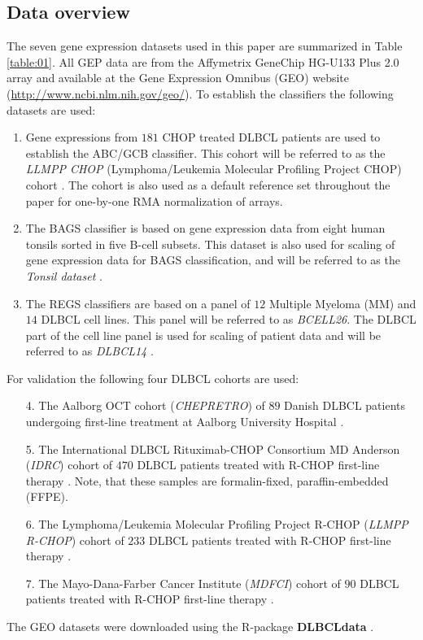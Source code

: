 \documentclass[10pt,letterpaper]{article}
\newcommand{\R}{\textsf{R}}
\newcommand{\pkg}[1]{\textbf{#1}}
\begin{document}
\subsection*{Data overview}
The seven gene expression datasets used in this paper are summarized in Table \ref{table:01}.
All GEP data are from the Affymetrix GeneChip HG-U133 Plus 2.0 array and available at the Gene Expression Omnibus (GEO) \cite{Barrett2013} website (\url{http://www.ncbi.nlm.nih.gov/geo/}).
To establish the classifiers the following datasets are used:
\begin{enumerate}
	\item Gene expressions from $181$ CHOP treated DLBCL patients are used to establish the ABC/GCB classifier.
	This cohort will be referred to as the \emph{LLMPP CHOP} (Lymphoma/Leukemia Molecular Profiling Project CHOP) cohort \cite{Lenz2008a}.
	The cohort is also used as a default reference set throughout the paper for one-by-one RMA normalization of arrays.
	\item The BAGS classifier is based on gene expression data from eight human tonsils sorted in five B-cell subsets.
	This dataset is also used for scaling of gene expression data for BAGS classification, and will be referred to as the \emph{Tonsil dataset} \cite{DybkaerBoegsted2015}.
	\item The REGS classifiers are based on a panel of $12$ Multiple Myeloma (MM) and $14$ DLBCL cell lines.
	This panel will be referred to as \emph{BCELL26}.
	The DLBCL part of the cell line panel is used for scaling of patient data and will be referred to as \emph{DLBCL14} \cite{Falgreen2015}.
\end{enumerate}
For validation the following four DLBCL cohorts are used:
\begin{enumerate}
	\item[4.] The Aalborg OCT cohort (\emph{CHEPRETRO}) of $89$ Danish DLBCL patients undergoing first-line treatment at Aalborg University Hospital \cite{DybkaerBoegsted2015}.
	\item[5.] The International DLBCL Rituximab-CHOP Consortium MD Anderson (\emph{IDRC}) cohort of $470$ DLBCL patients treated with R-CHOP first-line therapy \cite{Visco2012}.
	Note, that these samples are formalin-fixed, paraffin-embedded (FFPE).
	\item[6.] The Lymphoma/Leukemia Molecular Profiling Project R-CHOP (\emph{LLMPP R-CHOP}) cohort of $233$ DLBCL patients treated with R-CHOP first-line therapy \cite{Lenz2008a}.
	\item[7.] The Mayo-Dana-Farber Cancer Institute (\emph{MDFCI}) cohort of $90$ DLBCL patients treated with R-CHOP first-line therapy \cite{Monti2012a}.
\end{enumerate}
The GEO datasets were downloaded using the \R{}-package \pkg{DLBCLdata} \cite{DLBCLdata}.
\end{document}
